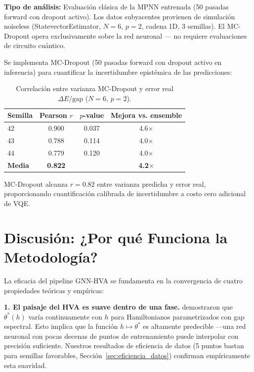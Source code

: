 \documentclass[11pt,a4paper,spanish]{book}
\begin{document}
\textbf{Tipo de análisis:} Evaluación clásica de la MPNN entrenada (50 pasadas forward con dropout activo). Los datos subyacentes provienen de simulación noiseless (StatevectorEstimator, $N = 6$, $p = 2$, cadena 1D, 3 semillas). El MC-Dropout opera exclusivamente sobre la red neuronal --- no requiere evaluaciones de circuito cuántico.

Se implementa MC-Dropout \citep{gal2016} (50 pasadas forward con dropout activo en inferencia) para cuantificar la incertidumbre epistémica de las predicciones:

\begin{table}[h]
\centering
\caption{Correlación entre varianza MC-Dropout y error real $\Delta E/\text{gap}$ ($N = 6$, $p = 2$).}
\label{tab:mc_dropout}
\begin{tabular}{lccc}
\toprule
\textbf{Semilla} & \textbf{Pearson $r$} & \textbf{$p$-value} & \textbf{Mejora vs. ensemble} \\
\midrule
42 & 0.900 & 0.037 & 4.6$\times$ \\
43 & 0.788 & 0.114 & 4.0$\times$ \\
44 & 0.779 & 0.120 & 4.0$\times$ \\
\midrule
\textbf{Media} & \textbf{0.822} & & \textbf{4.2$\times$} \\
\bottomrule
\end{tabular}
\end{table}

MC-Dropout \citep{gal2016} alcanza $r = 0.82$ entre varianza predicha y error real, proporcionando cuantificación calibrada de incertidumbre a costo cero adicional de VQE.

\section{Discusión: ¿Por qué Funciona la Metodología?}

La eficacia del pipeline GNN-HVA se fundamenta en la convergencia de cuatro propiedades teóricas y empíricas:

\textbf{1. El paisaje del HVA es suave dentro de una fase.} \citet{mele2022} demostraron que $\theta^*(h)$ varía continuamente con $h$ para Hamiltonianos parametrizados con gap espectral. Esto implica que la función $h \mapsto \theta^*$ es altamente predecible ---una red neuronal con pocas decenas de puntos de entrenamiento puede interpolar con precisión suficiente. Nuestros resultados de eficiencia de datos (5 puntos bastan para semillas favorables, Sección~\ref{sec:eficiencia_datos}) confirman empíricamente esta suavidad.
\end{document}
